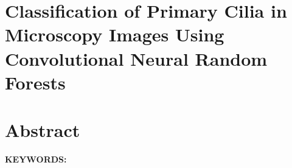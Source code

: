 \section{Classification of Primary Cilia in Microscopy Images Using Convolutional Neural Random Forests}\label{ch:cilia}

\section{Abstract}


\textbf{KEYWORDS:\ } %

\newpage

